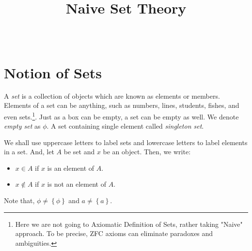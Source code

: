 \documentclass[11pt]{scrartcl}
\begin{document}
    
    \title{Naive Set Theory}
    \subtitle{
        \color{Brown}{Instructor: Saugata Bandopadhyay} \\ {\small \color{darkgray}{Department of Mathematics and Statistics, IISER Kolkata}}}
    \maketitle

    \vspace{-2em}

    \section{Notion of Sets}
    A \emph{set} is a collection of objects which are known as elements or members. Elements of a set can be anything, such as numbers, lines, students, fishes, and even sets.\footnote{Here we are not going to Axiomatic Definition of Sets, rather taking "Naive" approach. To be precise, ZFC axioms can eliminate paradoxes and ambiguities.}. Just as a box can be empty, a set can be empty as well. We denote \emph{empty set} as \(\phi\). A set containing single element called \emph{singleton set}.
    
    \begin{definition}
        We shall use uppercase letters to label sets and lowercase letters to label elements in a set. And, let \(A\) be set and \(x\) be an object. Then, we write: \begin{itemize}
            \item \(x \in A\) if \(x\) is an element of \(A\).
            \item \(x \notin A\) if \(x\) is not an element of \(A\).
        \end{itemize}
    \end{definition}

    \begin{remark}
        Note that, \(\phi \neq \left\{\phi\right\}\) and \(a \neq \left\{a\right\}\).
    \end{remark}
\end{document}
